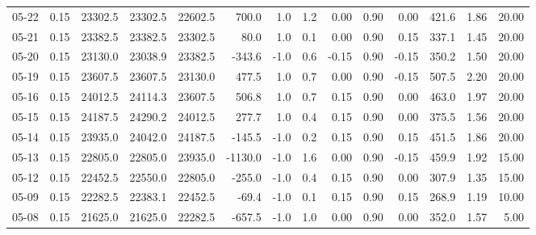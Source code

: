 \begin{threeparttable}
{\begin{tabular}{lrrrrrrrrrrrrr}
  05-22 &     0.15 & 23302.5 & 23302.5 & 22602.5 &      700.0 &                      1.0 &                 1.2 &       0.00 &      0.90 &           0.00 &            421.6 &            1.86 &                  20.00 \\
  05-21 &     0.15 & 23382.5 & 23382.5 & 23302.5 &       80.0 &                      1.0 &                 0.1 &       0.00 &      0.90 &           0.15 &            337.1 &            1.45 &                  20.00 \\
  05-20 &     0.15 & 23130.0 & 23038.9 & 23382.5 &     -343.6 &                     -1.0 &                 0.6 &      -0.15 &      0.90 &          -0.15 &            350.2 &            1.50 &                  20.00 \\
  05-19 &     0.15 & 23607.5 & 23607.5 & 23130.0 &      477.5 &                      1.0 &                 0.7 &       0.00 &      0.90 &          -0.15 &            507.5 &            2.20 &                  20.00 \\
  05-16 &     0.15 & 24012.5 & 24114.3 & 23607.5 &      506.8 &                      1.0 &                 0.7 &       0.15 &      0.90 &           0.00 &            463.0 &            1.97 &                  20.00 \\
  05-15 &     0.15 & 24187.5 & 24290.2 & 24012.5 &      277.7 &                      1.0 &                 0.4 &       0.15 &      0.90 &           0.00 &            375.5 &            1.56 &                  20.00 \\
  05-14 &     0.15 & 23935.0 & 24042.0 & 24187.5 &     -145.5 &                     -1.0 &                 0.2 &       0.15 &      0.90 &           0.15 &            451.5 &            1.86 &                  20.00 \\
  05-13 &     0.15 & 22805.0 & 22805.0 & 23935.0 &    -1130.0 &                     -1.0 &                 1.6 &       0.00 &      0.90 &          -0.15 &            459.9 &            1.92 &                  15.00 \\
  05-12 &     0.15 & 22452.5 & 22550.0 & 22805.0 &     -255.0 &                     -1.0 &                 0.4 &       0.15 &      0.90 &           0.00 &            307.9 &            1.35 &                  15.00 \\
  05-09 &     0.15 & 22282.5 & 22383.1 & 22452.5 &      -69.4 &                     -1.0 &                 0.1 &       0.15 &      0.90 &           0.15 &            268.9 &            1.19 &                  10.00 \\
  05-08 &     0.15 & 21625.0 & 21625.0 & 22282.5 &     -657.5 &                     -1.0 &                 1.0 &       0.00 &      0.90 &           0.00 &            352.0 &            1.57 &                   5.00 \\

\end{tabular}}
\end{threeparttable}
